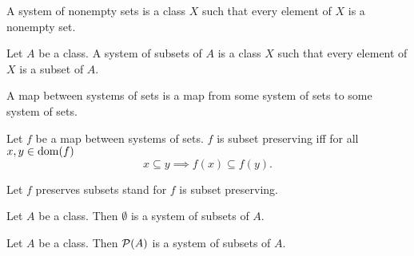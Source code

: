 \documentclass[10pt]{article}
\begin{document}
  \begin{forthel}
    \begin{definition}
      A system of nonempty sets is a class $X$ such that every element of $X$ is
      a nonempty set.
    \end{definition}
  \end{forthel}

  \begin{forthel}
    \begin{definition}
      Let $A$ be a class.
      A system of subsets of $A$ is a class $X$ such that every element of $X$
      is a subset of $A$.
    \end{definition}
  \end{forthel}

  \begin{forthel}
    \begin{definition}
      A map between systems of sets is a map from some system of sets to some
      system of sets.
    \end{definition}
  \end{forthel}

  \begin{forthel}
    \begin{definition}
      Let $f$ be a map between systems of sets.
      $f$ is subset preserving iff for all $x, y \in \operatorname{dom}(f)$
      \[ x \subseteq y \implies f(x) \subseteq f(y). \]
    \end{definition}

    Let $f$ preserves subsets stand for $f$ is subset preserving.
  \end{forthel}

  \begin{forthel}
    \begin{proposition}
      Let $A$ be a class.
      Then $\emptyset$ is a system of subsets of $A$.
    \end{proposition}
  \end{forthel}

  \begin{forthel}
    \begin{proposition}
      Let $A$ be a class.
      Then $\mathcal{P}(A)$ is a system of subsets of $A$.
    \end{proposition}
  \end{forthel}
\end{document}
